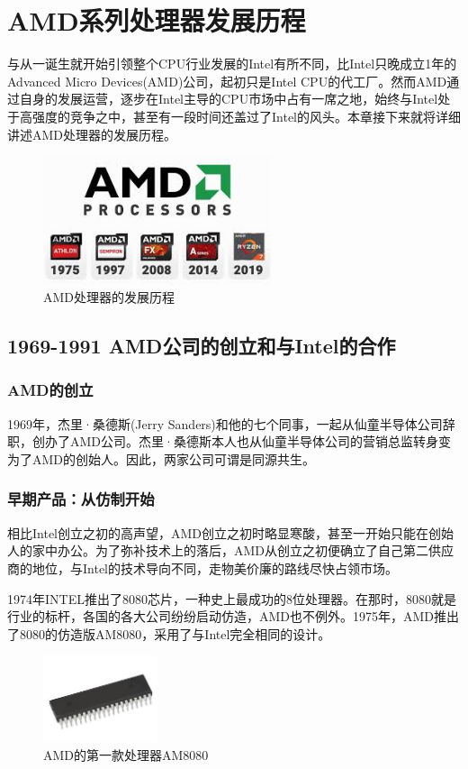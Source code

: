 \documentclass[UTF8]{ctexart}
\begin{document}
\section{AMD系列处理器发展历程}
与从一诞生就开始引领整个CPU行业发展的Intel有所不同，比Intel只晚成立1年的Advanced Micro Devices(AMD)公司，起初只是Intel CPU的代工厂。然而AMD通过自身的发展运营，逐步在Intel主导的CPU市场中占有一席之地，始终与Intel处于高强度的竞争之中，甚至有一段时间还盖过了Intel的风头。本章接下来就将详细讲述AMD处理器的发展历程。
\begin{figure}[H]
    \begin{center}
        \includegraphics[width=0.6\textwidth]{figure/AMDdev.jpg}
        \caption{AMD处理器的发展历程}
    \end{center}
\end{figure}

\subsection{1969-1991 AMD公司的创立和与Intel的合作}
\subsubsection{AMD的创立}
1969年，杰里·桑德斯(Jerry Sanders)和他的七个同事，一起从仙童半导体公司辞职，创办了AMD公司。杰里·桑德斯本人也从仙童半导体公司的营销总监转身变为了AMD的创始人。因此，两家公司可谓是同源共生。


\subsubsection{早期产品：从仿制开始}
相比Intel创立之初的高声望，AMD创立之初时略显寒酸，甚至一开始只能在创始人的家中办公。为了弥补技术上的落后，AMD从创立之初便确立了自己第二供应商的地位，与Intel的技术导向不同，走物美价廉的路线尽快占领市场。

1974年INTEL推出了8080芯片，一种史上最成功的8位处理器。在那时，8080就是行业的标杆，各国的各大公司纷纷启动仿造，AMD也不例外。1975年，AMD推出了8080的仿造版AM8080，采用了与Intel完全相同的设计。
\begin{figure}[H]
    \begin{center}
        \includegraphics[width=0.3\textwidth]{figure/AM8080.jpg}
        \caption{AMD的第一款处理器AM8080}
    \end{center}
\end{figure}
\end{document}
